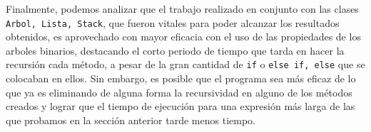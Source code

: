 \documentclass[letterpaper,11pt]{article} %
\begin{document}
\newp Finalmente, podemos analizar que el trabajo realizado en conjunto con las clases \texttt{Arbol, Lista, Stack}, que fueron vitales para poder alcanzar los resultados obtenidos, es aprovechado con mayor eficacia con el uso de las propiedades de los arboles binarios, destacando el corto periodo de tiempo que tarda en hacer la recursión cada método, a pesar de la gran cantidad de \texttt{if} o \texttt{else if, else} que se colocaban en ellos.
\newp Sin embargo, es posible que el programa sea más eficaz de lo que ya es eliminando de alguna forma la recursividad en alguno de los métodos creados y lograr que el tiempo de ejecución para una expresión más larga de las que probamos en la sección anterior tarde menos tiempo.

\newpage
{}
\end{document}
